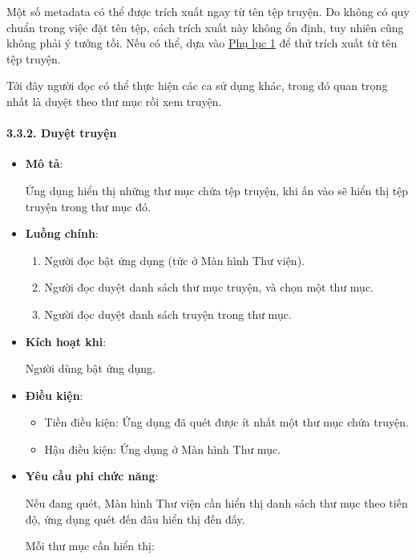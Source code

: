 \documentclass[
]{article}
\begin{document}
Một số metadata có thể được trích xuất ngay từ tên tệp truyện. Do không
có quy chuẩn trong việc đặt tên tệp, cách trích xuất này không ổn định,
tuy nhiên cũng không phải ý tưởng tồi. Nếu có thể, dựa vào
\protect\hyperlink{P8.1-metadata}{Phụ lục 1} để thử trích xuất từ tên
tệp truyện.

Tới đây người đọc có thể thực hiện các ca sử dụng khác, trong đó quan
trọng nhất là duyệt theo thư mục rồi xem truyện.

\hypertarget{duyux1ec7t-truyux1ec7n}{%
\paragraph{\texorpdfstring{3.3.2. Duyệt truyện
}{3.3.2. Duyệt truyện }}\label{duyux1ec7t-truyux1ec7n}}

\begin{itemize}
\item
  \textbf{Mô tả}:

  Ứng dụng hiển thị những thư mục chứa tệp truyện, khi ấn vào sẽ hiển
  thị tệp truyện trong thư mục đó.
\item
  \textbf{Luồng chính}:

  \begin{enumerate}
  \def\labelenumi{\arabic{enumi}.}
    \item
    Người đọc bật ứng dụng (tức ở Màn hình Thư viện).
  \item
    Người đọc duyệt danh sách thư mục truyện, và chọn một thư mục.
  \item
    Người đọc duyệt danh sách truyện trong thư mục.
  \end{enumerate}
\item
  \textbf{Kích hoạt khi}:

  Người dùng bật ứng dụng.
\item
  \textbf{Điều kiện}:

  \begin{itemize}
    \item
    Tiền điều kiện: Ứng dụng đã quét được ít nhất một thư mục chứa
    truyện.
  \item
    Hậu điều kiện: Ứng dụng ở Màn hình Thư mục.
  \end{itemize}
\item
  \textbf{Yêu cầu phi chức năng}:

  Nếu đang quét, Màn hình Thư viện cần hiển thị danh sách thư mục theo
  tiến độ, ứng dụng quét đến đâu hiển thị đến đấy.

  Mỗi thư mục cần hiển thị:


\end{itemize}
\end{document}

